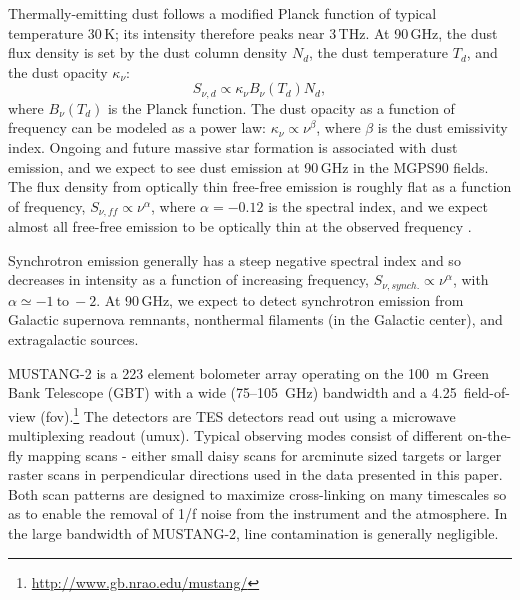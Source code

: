 \documentclass[twocolumn]{aastex62}
\newcommand{\MUSTANG}{MUSTANG-2\xspace}
\begin{document}

Thermally-emitting dust follows a modified Planck function of typical temperature
30\,K; its intensity therefore peaks near 3\,THz.  At 90\,GHz, the dust flux
density is set by the dust column density $N_d$, the dust temperature $T_d$,
and the dust opacity $\kappa_\nu$:
\begin{equation}
    S_{\nu, d} \propto \kappa_\nu B_\nu(T_d) N_d,
    \label{eq:dust}
\end{equation}
where $B_\nu(T_d)$ is the Planck function.  The dust opacity as a function of
frequency can be modeled as a power law: $\kappa_\nu \propto \nu^{\beta}$,
where $\beta$ is the dust emissivity index.
Ongoing and future massive star formation is associated with dust emission, and
we expect to see dust emission at 90\,GHz in the MGPS90 fields.  
The flux density from optically thin free-free emission is roughly flat as a
function of frequency, $S_{\nu, ff} \propto \nu^{\alpha}$, where $\alpha=-0.12$
is the spectral index, and we expect almost
all free-free emission to be optically thin at the observed frequency
\citep{Wilson2009a,Condon2007a,Condon2016a}. 

Synchrotron emission generally has a steep negative spectral index and so
decreases in intensity as a function of increasing frequency, $S_{\nu,
synch.}\propto \nu^{\alpha}$, with $\alpha\simeq -1 \mathrm{~to~} -2$.  At 90\,GHz, we expect
to detect synchrotron emission from Galactic supernova remnants, nonthermal
filaments (in the Galactic center), and extragalactic sources.


\MUSTANG \citep{Dicker2014a} is a 223 element bolometer array operating on the 100~m Green Bank Telescope (GBT) with a wide (75--105~GHz) bandwidth and a 4.25\arcmin\ field-of-view (fov).\footnote{\url{http://www.gb.nrao.edu/mustang/}}  The detectors are TES detectors read out using a microwave multiplexing readout (umux). Typical observing modes consist of different on-the-fly mapping scans - either small daisy scans for arcminute sized targets or larger raster scans in perpendicular directions used in the data presented in this paper.  Both scan patterns are designed to maximize cross-linking on many timescales so as to enable the removal of 1/f noise from the instrument and the atmosphere.  In the large bandwidth of \MUSTANG, line contamination is generally negligible.
\end{document}
